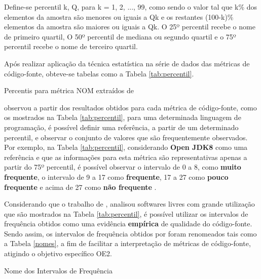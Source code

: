Define-se percentil k, Q, para k = 1, 2, ..., 99, como sendo o valor tal que k\% dos elementos da amostra são menores ou iguais a Qk e os restantes (100-k)\% elementos da amostra são maiores ou iguais a Qk. O 25º percentil  recebe o nome de primeiro quartil, O 50º percentil de mediana ou segundo quartil e o 75º percentil recebe o nome de terceiro quartil.

Após realizar aplicação da técnica estatística na série de dados das métricas de código-fonte, obteve-se tabelas como a Tabela \ref{tab:percentil}.



	\begin{table}[!ht]
	\begin{center}
	
	 
	\caption{Percentis para métrica NOM extraídos de  
	}
	\label{tab:percentil}
	\end{center}
	\end{table}	
	\FloatBarrier	



 observou a partir dos resultados obtidos para cada métrica de código-fonte, como os mostrados na Tabela \ref{tab:percentil}, para uma determinada linguagem de programação, é possível definir uma referência, a partir de um determinado percentil, e observar o conjunto de valores que são frequentemente observados. Por exemplo, na Tabela \ref{tab:percentil}, considerando \textbf{Open JDK8} como uma referência e que as informações para esta métrica são representativas apenas a partir do 75º percentil, é possível observar o intervalo de 0 a 8, como  \textbf{muito frequente}, o intervalo de 9 a 17 como \textbf{frequente}, 17 a 27 como \textbf{pouco frequente} e acima de 27 como \textbf{não frequente} \cite{Meirelles2013}.  


Considerando que o trabalho de , analisou softwares livres com grande utilização que são mostrados na Tabela \ref{tab:percentil}, é possível utilizar os intervalos de frequência obtidos como uma evidência \textbf{empírica} de qualidade do código-fonte. Sendo assim, os intervalos de frequência obtidos por  foram renomeados tais como a Tabela \ref{nomes}, a fim de facilitar a interpretação de métricas de código-fonte, atigindo o objetivo específico OE2. 

	\begin{table}[!ht]
	\begin{center}
	
	\caption{Nome dos Intervalos de Frequência}
	\label{nomes}
	\end{center}
	\end{table}
		
